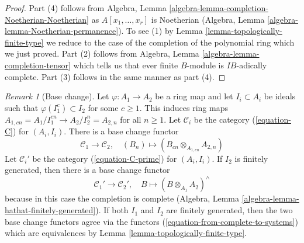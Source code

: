\documentclass{stacks-project}
\theoremstyle{plain}
\theoremstyle{definition}
\theoremstyle{remark}
\newtheorem{remark}[subsection]{Remark}
\numberwithin{equation}{subsection}
\begin{document}
\begin{proof}
Part (4) follows from
Algebra, Lemma \ref{algebra-lemma-completion-Noetherian-Noetherian}
as $A[x_1, \ldots, x_r]$ is Noetherian
(Algebra, Lemma \ref{algebra-lemma-Noetherian-permanence}).
To see (1) by Lemma \ref{lemma-topologically-finite-type}
we reduce to the case of the completion of the polynomial ring
which we just proved.
Part (2) follows from Algebra, Lemma \ref{algebra-lemma-completion-tensor}
which tells us that ever finite $B$-module is $IB$-adically complete.
Part (3) follows in the same manner as part (4).
\end{proof}

\begin{remark}[Base change]
\label{remark-base-change}
Let $\varphi : A_1 \to A_2$ be a ring map and let
$I_i \subset A_i$ be ideals such that $\varphi(I_1^c) \subset I_2$
for some $c \geq 1$. This induces ring maps
$A_{1, cn} = A_1/I_1^{cn} \to A_2/I_2^n = A_{2, n}$ for all $n \geq 1$.
Let $\mathcal{C}_i$ be the category (\ref{equation-C}) for $(A_i, I_i)$.
There is a base change functor
\begin{equation}
\label{equation-base-change-systems}
\mathcal{C}_1 \longrightarrow \mathcal{C}_2,\quad
(B_n) \longmapsto (B_{cn} \otimes_{A_{1, cn}} A_{2, n})
\end{equation}
Let $\mathcal{C}_i'$ be the category (\ref{equation-C-prime}) for $(A_i, I_i)$.
If $I_2$ is finitely generated, then there is a base change functor
\begin{equation}
\label{equation-base-change-complete}
\mathcal{C}_1' \longrightarrow \mathcal{C}_2',\quad
B \longmapsto (B \otimes_{A_1} A_2)^\wedge
\end{equation}
because in this case the completion is complete
(Algebra, Lemma \ref{algebra-lemma-hathat-finitely-generated}).
If both $I_1$ and $I_2$ are finitely generated, then
the two base change functors agree via the functors
(\ref{equation-from-complete-to-systems})
which are equivalences by Lemma \ref{lemma-topologically-finite-type}.
\end{remark}
\end{document}
